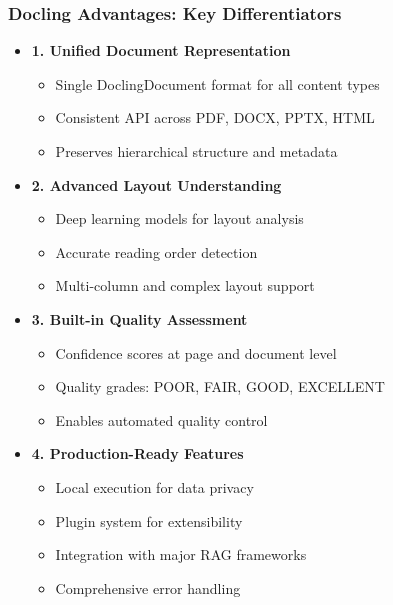 \begin{frame}[fragile]\frametitle{Docling Advantages: Key Differentiators}
      \begin{itemize}
        \item \textbf{1. Unified Document Representation}
        \begin{itemize}
            \item Single DoclingDocument format for all content types
            \item Consistent API across PDF, DOCX, PPTX, HTML
            \item Preserves hierarchical structure and metadata
        \end{itemize}
        \item \textbf{2. Advanced Layout Understanding}
        \begin{itemize}
            \item Deep learning models for layout analysis
            \item Accurate reading order detection
            \item Multi-column and complex layout support
        \end{itemize}
        \item \textbf{3. Built-in Quality Assessment}
        \begin{itemize}
            \item Confidence scores at page and document level
            \item Quality grades: POOR, FAIR, GOOD, EXCELLENT
            \item Enables automated quality control
        \end{itemize}
        \item \textbf{4. Production-Ready Features}
        \begin{itemize}
            \item Local execution for data privacy
            \item Plugin system for extensibility
            \item Integration with major RAG frameworks
            \item Comprehensive error handling
        \end{itemize}
      \end{itemize}
\end{frame}

